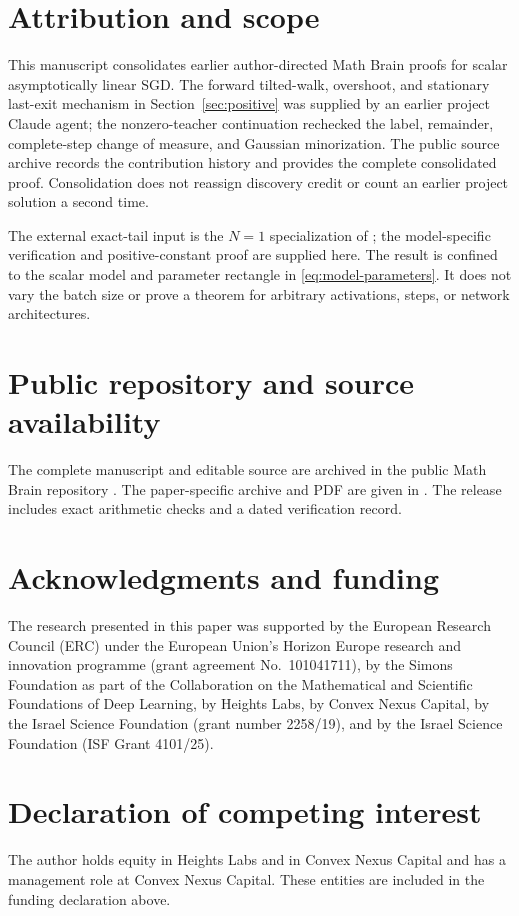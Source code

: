 \documentclass[11pt,a4paper]{article}
\numberwithin{equation}{section}
\theoremstyle{remark}
\begin{document}
\section{Attribution and scope}\label{sec:attribution}

This manuscript consolidates earlier author-directed Math Brain proofs
for scalar asymptotically linear SGD. The forward tilted-walk,
overshoot, and stationary last-exit mechanism in Section~\ref{sec:positive}
was supplied by an earlier project Claude agent; the nonzero-teacher
continuation rechecked the
label, remainder, complete-step change of measure, and Gaussian
minorization. The public source archive records the contribution history and provides
the complete consolidated proof. Consolidation does not reassign
discovery credit or count an earlier project solution a second time.

The external exact-tail input is the $N=1$ specialization of
\cite[Theorem 3.1]{JO2012Thm31}; the model-specific verification and
positive-constant proof are supplied here. The result is confined to the
scalar model and parameter rectangle in \eqref{eq:model-parameters}.
It does not vary the batch size or prove a theorem for arbitrary
activations, steps, or network architectures.

\section*{Public repository and source availability}
The complete manuscript and editable source are archived in the public
Math Brain repository \cite{MathBrainPublic}. The paper-specific archive
and PDF are given in \cite{ThisPaperArchive}. The release includes exact
arithmetic checks and a dated verification record.

\section*{Acknowledgments and funding}
The research presented in this paper was supported by the European Research Council (ERC) under the European Union's Horizon Europe research and innovation programme (grant agreement No.~101041711), by the Simons Foundation as part of the Collaboration on the Mathematical and Scientific Foundations of Deep Learning, by Heights Labs, by Convex Nexus Capital, by the Israel Science Foundation (grant number 2258/19), and by the Israel Science Foundation (ISF Grant 4101/25).

\section*{Declaration of competing interest}
The author holds equity in Heights Labs and in Convex Nexus Capital and has a management role at Convex Nexus Capital. These entities are included in the funding declaration above.
\end{document}
